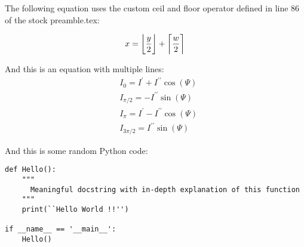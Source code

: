 The following equation uses the custom ceil and floor operator defined in line 86 of the stock preamble.tex:

\begin{equation}
x = \floor*{\frac{y}{2}} + \ceil*{\frac{w}{2}}
\end{equation}


And this is an equation with multiple lines:
\begin{equation}
\begin{aligned}
&I_{0}=I^{\prime}+I^{\prime\prime}\cos(\varPsi)   \\
&I_{\pi/2}=-I^{\prime\prime}\sin(\varPsi)                \\
&I_{\pi}=I^{\prime}-I^{\prime\prime}\cos(\varPsi)   \\
&I_{3\pi/2}=I^{\prime\prime}\sin(\varPsi)
\end{aligned}
\end{equation}

And this is some random Python code:

\begin{lstlisting}[style = Python]
def Hello():
    """
      Meaningful docstring with in-depth explanation of this function
    """
    print(``Hello World !!'')

if __name__ == '__main__':
    Hello()
\end{lstlisting}
